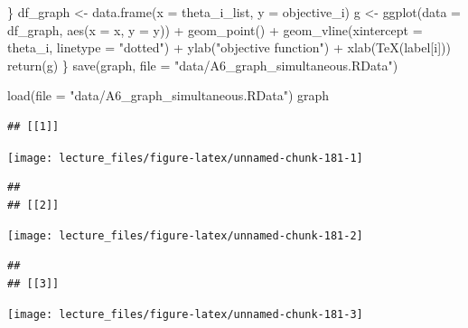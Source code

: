 \documentclass[
]{book}
\newenvironment{Shaded}{\begin{snugshade}}{\end{snugshade}}
\newcommand{\AttributeTok}[1]{\textcolor[rgb]{0.77,0.63,0.00}{#1}}
\newcommand{\FunctionTok}[1]{\textcolor[rgb]{0.00,0.00,0.00}{#1}}
\newcommand{\NormalTok}[1]{#1}
\newcommand{\OtherTok}[1]{\textcolor[rgb]{0.56,0.35,0.01}{#1}}
\newcommand{\SpecialCharTok}[1]{\textcolor[rgb]{0.00,0.00,0.00}{#1}}
\newcommand{\StringTok}[1]{\textcolor[rgb]{0.31,0.60,0.02}{#1}}
\begin{document}
\begin{Shaded}
\begin{Highlighting}[]
\NormalTok{             \}}
\NormalTok{  df\_graph }\OtherTok{\textless{}{-}} \FunctionTok{data.frame}\NormalTok{(}\AttributeTok{x =}\NormalTok{ theta\_i\_list, }\AttributeTok{y =}\NormalTok{ objective\_i) }
\NormalTok{  g }\OtherTok{\textless{}{-}} \FunctionTok{ggplot}\NormalTok{(}\AttributeTok{data =}\NormalTok{ df\_graph, }\FunctionTok{aes}\NormalTok{(}\AttributeTok{x =}\NormalTok{ x, }\AttributeTok{y =}\NormalTok{ y)) }\SpecialCharTok{+} 
    \FunctionTok{geom\_point}\NormalTok{() }\SpecialCharTok{+}
    \FunctionTok{geom\_vline}\NormalTok{(}\AttributeTok{xintercept =}\NormalTok{ theta\_i, }\AttributeTok{linetype =} \StringTok{"dotted"}\NormalTok{) }\SpecialCharTok{+}
    \FunctionTok{ylab}\NormalTok{(}\StringTok{"objective function"}\NormalTok{) }\SpecialCharTok{+} \FunctionTok{xlab}\NormalTok{(}\FunctionTok{TeX}\NormalTok{(label[i]))}
  \FunctionTok{return}\NormalTok{(g)}
\NormalTok{\}}
\FunctionTok{save}\NormalTok{(graph, }\AttributeTok{file =} \StringTok{"data/A6\_graph\_simultaneous.RData"}\NormalTok{)}
\end{Highlighting}
\end{Shaded}

\begin{Shaded}
\begin{Highlighting}[]
\FunctionTok{load}\NormalTok{(}\AttributeTok{file =} \StringTok{"data/A6\_graph\_simultaneous.RData"}\NormalTok{)}
\NormalTok{graph}
\end{Highlighting}
\end{Shaded}

\begin{verbatim}
## [[1]]
\end{verbatim}

\begin{center}\texttt{[image: lecture\_files/figure-latex/unnamed-chunk-181-1]} \end{center}

\begin{verbatim}
## 
## [[2]]
\end{verbatim}

\begin{center}\texttt{[image: lecture\_files/figure-latex/unnamed-chunk-181-2]} \end{center}

\begin{verbatim}
## 
## [[3]]
\end{verbatim}

\begin{center}\texttt{[image: lecture\_files/figure-latex/unnamed-chunk-181-3]} \end{center}
\end{document}
